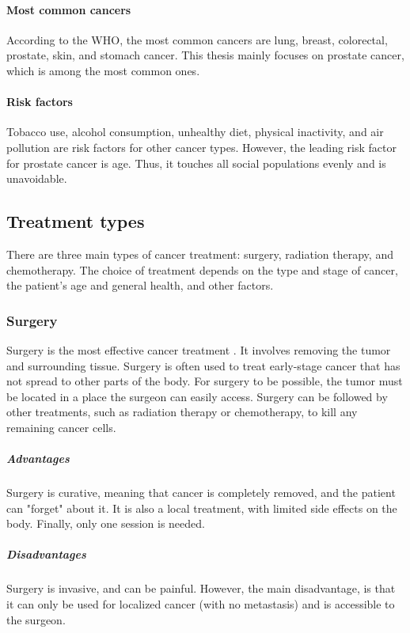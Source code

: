 \paragraph{Most common cancers}
According to the WHO, the most common cancers are lung, breast, colorectal, prostate, skin, and stomach cancer.
This thesis mainly focuses on prostate cancer, which is among the most common ones.

\paragraph{Risk factors}
Tobacco use, alcohol consumption, unhealthy diet, physical inactivity, and air pollution are risk factors for other cancer types.
However, the leading risk factor for prostate cancer is age.
Thus, it touches all social populations evenly and is unavoidable.

\subsection{Treatment types}
There are three main types of cancer treatment: surgery, radiation therapy, and chemotherapy.
The choice of treatment depends on the type and stage of cancer, the patient's age and general health, and other factors.

\subsubsection{Surgery}
Surgery is the most effective cancer treatment \cite{Klein2009}.
It involves removing the tumor and surrounding tissue.
Surgery is often used to treat early-stage cancer that has not spread to other parts of the body.
For surgery to be possible, the tumor must be located in a place the surgeon can easily access.
Surgery can be followed by other treatments, such as radiation therapy or chemotherapy, to kill any remaining cancer cells.

\subparagraph{Advantages}
Surgery is curative, meaning that cancer is completely removed, and the patient can "forget" about it.
It is also a local treatment, with limited side effects on the body.
Finally, only one session is needed.

\subparagraph{Disadvantages}
Surgery is invasive, and can be painful.
However, the main disadvantage, is that it can only be used for localized cancer (with no metastasis) and is accessible to the surgeon.

